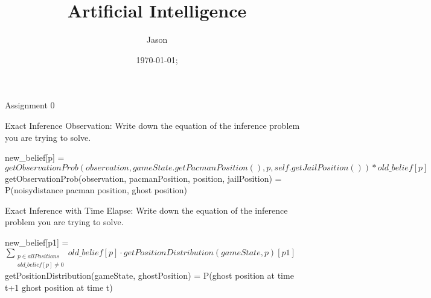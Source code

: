 \documentclass[12pt]{article}
\newenvironment{Question}[2][Question]{\begin{trivlist}
\item[\hskip \labelsep {\bfseries #1}\hskip \labelsep {\bfseries #2.}]}{\end{trivlist}}
\begin{document}
\title{Artificial Intelligence}
\author{Jason}
\date{\today; \currenttime}
\maketitle

\begin{center}\begin{LARGE} Assignment 0 \end{LARGE}\end{center}

\begin{Question}{1}
 Exact Inference Observation: Write down the equation of the inference problem you are trying to solve.\\
\end{Question}
new\_belief[p] = $getObservationProb(observation, gameState.getPacmanPosition(), p, self.getJailPosition()) * old\_belief[p]$\\
getObservationProb(observation, pacmanPosition, position, jailPosition) = \\ P(noisydistance \textbar pacman position, ghost position)

\begin{Question}{2}
 Exact Inference with Time Elapse: Write down the equation of the inference problem you are trying to solve.\\
\end{Question}
new\_belief[p1] = $\sum_{\substack{p \in allPositions \\ old\_belief[p] \neq 0}} old\_belief[p] \cdot getPositionDistribution(gameState, p)[p1]$\\
getPositionDistribution(gameState, ghostPosition) = P(ghost position at time t+1 \textbar ghost position at time t)\\
\end{document}
